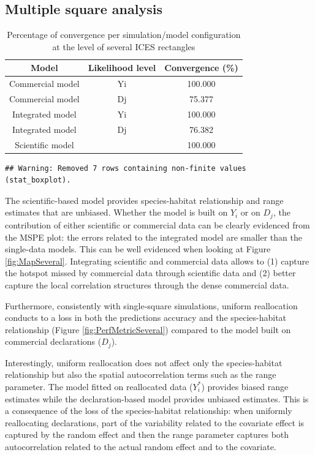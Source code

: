 \documentclass[
  english,
  man]{apa6}
\begin{document}
\hypertarget{multiple-square-analysis}{%
\subsection{Multiple square analysis}\label{multiple-square-analysis}}

\begin{table}

\caption{\label{tab:unnamed-chunk-4}Percentage of convergence per simulation/model configuration at the level of several ICES rectangles}
\centering
\begin{tabular}[t]{ccc}
\toprule
Model & Likelihood level & Convergence (\%)\\
\midrule
Commercial model & Yi & 100.000\\
Commercial model & Dj & 75.377\\
Integrated model & Yi & 100.000\\
Integrated model & Dj & 76.382\\
Scientific model &  & 100.000\\
\bottomrule
\end{tabular}
\end{table}

\begin{verbatim}
## Warning: Removed 7 rows containing non-finite values (stat_boxplot).
\end{verbatim}

The scientific-based model provides species-habitat relationship and range estimates that are unbiased. Whether the model is built on \(Y_i\) or on \(D_j\), the contribution of either scientific or commercial data can be clearly evidenced from the MSPE plot: the errors related to the integrated model are smaller than the single-data models. This can be well evidenced when looking at Figure \ref{fig:MapSeveral}. Integrating scientific and commercial data allows to (1) capture the hotspot missed by commercial data through scientific data and (2) better capture the local correlation structures through the dense commercial data.

Furthermore, consistently with single-square simulations, uniform reallocation conducts to a loss in both the predictions accuracy and the species-habitat relationship (Figure \ref{fig:PerfMetricSeveral}) compared to the model built on commercial declarations (\(D_j\)).

Interestingly, uniform reallocation does not affect only the species-habitat relationship but also the spatial autocorrelation terms such as the range parameter. The model fitted on reallocated data (\(Y_i^*\)) provides biased range estimates while the declaration-based model provides unbiased estimates. This is a consequence of the loss of the species-habitat relationship: when uniformly reallocating declarations, part of the variability related to the covariate effect is captured by the random effect and then the range parameter captures both autocorrelation related to the actual random effect and to the covariate.
\end{document}
